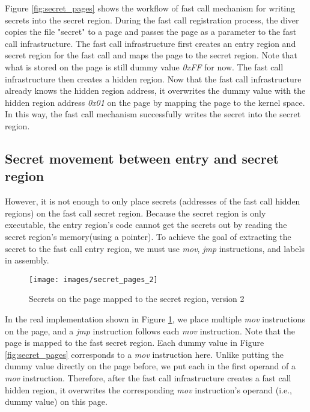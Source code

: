 Figure \ref{fig:secret_pages} shows the workflow of fast call mechanism for writing secrets into the secret region. 
During the fast call registration process,
the diver copies the file "secret" to a page and passes the page as a parameter to
 the fast call infrastructure. The fast call infrastructure first creates an entry 
 region and secret region for the fast call and maps the page to the secret region. 
 Note that what is stored on the page is still dummy value \emph{0xFF} for now. The fast call 
 infrastructure then creates a hidden region. Now that the fast call infrastructure 
 already knows the hidden region address, it overwrites the dummy value with the hidden 
 region address \emph{0x01} on the page by mapping the page to the kernel space. In this way, the fast call mechanism 
 successfully writes the secret into the secret region.


 \subsection{Secret movement between entry and secret region}
 However, it is not enough to only place secrets
 (addresses of the fast call hidden regions) on the fast call secret region. 
 Because the secret region is only executable, the entry region's code cannot 
 get the secrets out by reading the secret region's memory(using a pointer).
To achieve the goal of extracting the secret to the fast call entry region, 
  we must use \emph{mov}, \emph{jmp} instructions, and labels in assembly.

 \begin{figure}[tbp]
   \centering
   \texttt{[image: images/secret\_pages\_2]}
   \caption[Short description]{Secrets on the page mapped to the secret region, version 2}
    \label{fig:secret_pages_2}
 \end{figure}
  
 In the real implementation shown in Figure \ref{fig:secret_pages_2}, 
 we place multiple \emph{mov} instructions on the page,
 and a \emph{jmp} instruction follows each \emph{mov} instruction. Note that the page is mapped to the fast secret region. 
 Each dummy value in Figure \ref{fig:secret_pages} corresponds to a \emph{mov} instruction here. Unlike putting the 
 dummy value directly on the page before, we put each in the first operand of
  a \emph{mov} instruction. Therefore, after the fast call infrastructure creates a fast 
  call hidden region, it overwrites the corresponding \emph{mov} instruction's 
  operand (i.e., dummy value) on this page.  



